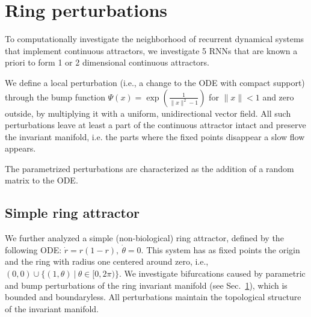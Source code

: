 \documentclass{article} %
\newcounter{ct}
\theoremstyle{definition}
\theoremstyle{remark}
\begin{document}
\newpage
\section{Ring perturbations}\label{sec:supp:ring_perturbations}


To computationally investigate the neighborhood of recurrent dynamical systems that implement continuous attractors, we investigate 5 RNNs that are known a priori to form 1 or 2 dimensional continuous attractors.

We define a local perturbation (i.e., a change to the ODE with compact support) through the bump function \(\Psi(x) = \exp\left(\frac{1}{\|x\|^{2} - 1}\right)\) for \(\|x\|<1\) and zero outside, by multiplying it with a uniform, unidirectional vector field. All such perturbations leave at least a part of the continuous attractor intact and preserve the invariant manifold, i.e. the parts where the fixed points disappear a slow flow appears.

The parametrized perturbations are characterized as the addition of a random matrix to the ODE.





\subsection{Simple ring attractor}
We further analyzed a simple (non-biological)  ring attractor, defined by the following ODE: \(\dot r = r(1 - r), \ \dot \theta = 0\).
This system has as fixed points the origin and the ring with radius one centered around zero, i.e., \((0, 0)\cup\{(1,\theta)\ |\ \theta \in [0, 2\pi)\}\). %
We investigate bifurcations caused by parametric and bump perturbations of the ring invariant manifold (see Sec.~\ref{sec:supp:ring_perturbations}), which is bounded and boundaryless.
All perturbations maintain the topological structure of the invariant manifold. %


\end{document}
